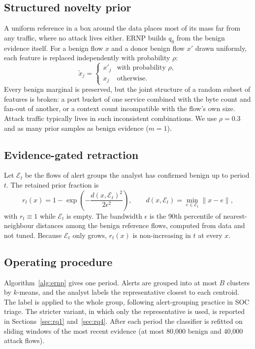 \documentclass[a4paper,fleqn]{cas-dc}
\newcommand{\ERNP}{ERNP\xspace}
\newcommand{\E}{\mathcal{E}}
\begin{document}
\subsection{Structured novelty prior}
\label{sec:prior}
A uniform reference in a box around the data \cite{sipple2020negative} places most of its mass far from any traffic, where no attack lives either. \ERNP builds $q_0$ from the benign evidence itself. For a benign flow $x$ and a donor benign flow $x'$ drawn uniformly, each feature is replaced independently with probability $\rho$:
\begin{equation}
\tilde x_j = \begin{cases} x'_j & \text{with probability } \rho,\\ x_j & \text{otherwise.}\end{cases}
\end{equation}
Every benign marginal is preserved, but the joint structure of a random subset of features is broken: a port bucket of one service combined with the byte count and fan-out of another, or a context count incompatible with the flow's own size. Attack traffic typically lives in such inconsistent combinations. We use $\rho=0.3$ and as many prior samples as benign evidence ($m=1$).

\subsection{Evidence-gated retraction}
\label{sec:retraction}
Let $\E_t$ be the flows of alert groups the analyst has confirmed benign up to period $t$. The retained prior fraction is
\begin{equation}
r_t(x) = 1-\exp\!\left(-\frac{d(x,\E_t)^2}{2\epsilon^2}\right),\qquad d(x,\E_t)=\min_{e\in\E_t}\lVert x-e\rVert,
\label{eq:retain}
\end{equation}
with $r_t\equiv1$ while $\E_t$ is empty. The bandwidth $\epsilon$ is the 90th percentile of nearest-neighbour distances among the benign reference flows, computed from data and not tuned. Because $\E_t$ only grows, $r_t(x)$ is non-increasing in $t$ at every $x$.

\subsection{Operating procedure}
Algorithm~\ref{alg:ernp} gives one period. Alerts are grouped into at most $B$ clusters by $k$-means, and the analyst labels the representative closest to each centroid. The label is applied to the whole group, following alert-grouping practice in SOC triage. The stricter variant, in which only the representative is used, is reported in Sections~\ref{sec:rq1} and~\ref{sec:rq4}. After each period the classifier is refitted on sliding windows of the most recent evidence (at most 80{,}000 benign and 40{,}000 attack flows).
\end{document}

